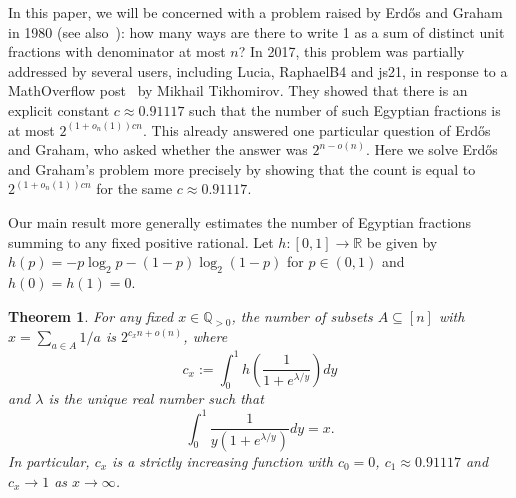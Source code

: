 \documentclass{daj}
\newtheorem{theorem}{Theorem}
\begin{document}
In this paper, we will be concerned with a problem raised by Erd\H{o}s and Graham~\cite[Page 36]{ErGr} in 1980 (see also~\cite[Problem 297]{Bl}): how many ways are there to write 1 as a sum of distinct unit fractions with denominator at most $n$? In 2017, this problem was partially addressed by several users, including Lucia, RaphaelB4 and js21, in response to a MathOverflow post~\cite{T17} by Mikhail Tikhomirov. They showed that there is an explicit constant $c \approx 0.91117$ such that the number of such Egyptian fractions is at most $2^{(1+o_n(1))c n}$. This already answered one particular question of Erd\H{o}s and Graham, who asked whether the answer was $2^{n-o(n)}$. Here we solve Erd\H{o}s and Graham's problem more precisely by showing that the count is equal to $2^{(1+o_n(1))cn}$ for the same $c \approx 0.91117$. 





Our main result more generally estimates the number of Egyptian fractions summing to any fixed positive rational. Let $h:[0,1]\to \mathbb{R}$ be given by $h(p) = -p\log_2 p - (1-p)\log_2(1-p)$ for $p\in (0,1)$ and $h(0)=h(1)=0$. 


\begin{theorem}\label{thm:main-count}
    For any fixed $x \in \mathbb{Q}_{>0}$, 
    the number of subsets $A\subseteq [n]$ with $x = \sum_{a\in A}1/a$ is $2^{c_x n + o(n)}$, where
    \[
        c_x := \int_{0}^{1}h\left(\frac{1}{1+e^{\lambda/y}}\right)dy
    \] 
    and $\lambda$ is the unique real number such that 
    \[
        \int_{0}^{1}\frac{1}{y(1+e^{\lambda/y})}dy = x.
    \]
    In particular, $c_x$ is a strictly increasing function with $c_0=0$, $c_1 \approx 0.91117$ and $c_x \to 1$ as $x \to \infty$.
\end{theorem}
\end{document}
